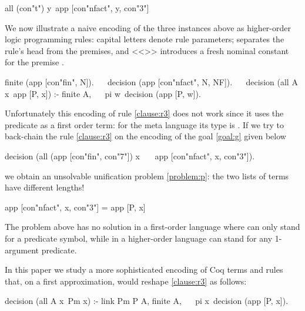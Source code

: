 \documentclass[sigconf,natbib=false,review]{acmart}
\begin{document}
\begin{elpicode}
all (con"t") y\ app [con"nfact", y, con"3"]
\end{elpicode}

\noindent
We now illustrate a naive encoding of the three instances above as higher-order
logic programming rules: capital letters denote rule
parameters; \elpiIn{:-} separates the rule's head from the premises, and
<<>> introduces a fresh nominal constant 
for the premise .

\begin{elpicode}
finite   (app [con"fin", N]).                         ~~
decision (app [con"nfact", N, NF]).                   ~~
decision (all A x\ app [P, x]) :- finite A,           ~~
  pi w\ decision (app [P, w]).
\end{elpicode}

\noindent
Unfortunately this encoding of rule \ref{clause:r3} does not work
since it uses the predicate  as a first order term: for the meta
language its type is . If we try to back-chain the rule
\ref{clause:r3} on the encoding of the goal \ref{goal:g} given below

\begin{elpicode}
decision (all (app [con"fin", con"7"]) x\              ~~
  app [con"nfact", x, con"3"]).
\end{elpicode}

\noindent
we obtain an unsolvable unification problem \ref{problem:p}:
the two lists of terms have different lengths!

\begin{elpicode}
app [con"nfact", x, con"3"] = app [P, x]               ~~
\end{elpicode}

\noindent
The problem above has no solution in a first-order language
where  can only stand for a predicate symbol, while in a higher-order
language  can stand for any 1-argument predicate.

In this paper we study a more sophisticated encoding of Coq terms and rules
that, on a first approximation, would reshape \ref{clause:r3} as follows:

\begin{elpicode}
decision (all A x\ Pm x) :- link Pm P A, finite A,    ~~
  pi x\ decision (app [P, x]).
\end{elpicode}
\end{document}
